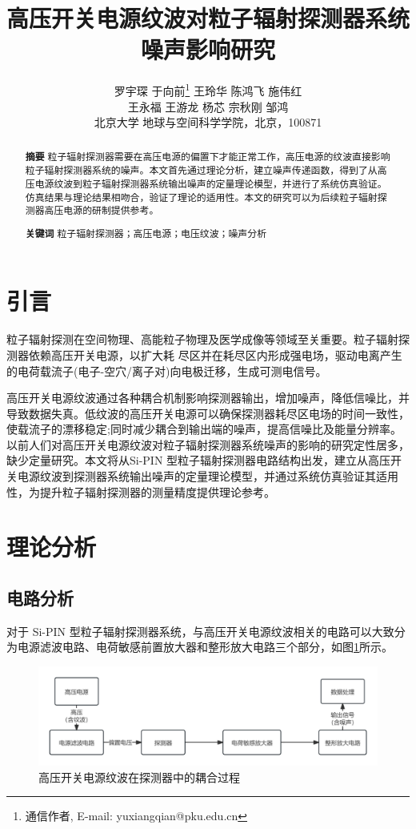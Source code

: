 \documentclass[twocolumn]{ctexart}
\title{高压开关电源纹波对粒子辐射探测器系统噪声影响研究}
\author{
    罗宇琛 \quad 于向前\thanks{通信作者, E-mail: yuxiangqian@pku.edu.cn} \quad 王玲华 \quad 陈鸿飞 \quad 施伟红 \\ 王永福 \quad 王游龙 \quad 杨芯 \quad 宗秋刚 \quad 邹鸿 \\[1ex]
    \small{北京大学 地球与空间科学学院，北京，100871}
}
\date{}
\begin{document}
\begin{abstract}
\noindent\textbf{摘要} \quad 粒子辐射探测器需要在高压电源的偏置下才能正常工作，高压电源的纹波直接影响粒子辐射探测器系统的噪声。本文首先通过理论分析，建立噪声传递函数，得到了从高压电源纹波到粒子辐射探测器系统输出噪声的定量理论模型，并进行了系统仿真验证。仿真结果与理论结果相吻合，验证了理论的适用性。本文的研究可以为后续粒子辐射探测器高压电源的研制提供参考。
\vspace{1em}

\noindent\textbf{关键词} \quad 粒子辐射探测器；高压电源；电压纹波；噪声分析
\end{abstract}

\maketitle
\thispagestyle{empty}

\section{引言}

粒子辐射探测在空间物理、高能粒子物理及医学成像等领域至关重要\cite{1, 2, 3}。粒子辐射探测器依赖高压开关电源，以扩大耗
尽区并在耗尽区内形成强电场，驱动电离产生的电荷载流子(电子-空穴/离子对)向电极迁移，生成可测电信号。

高压开关电源纹波通过各种耦合机制影响探测器输出，增加噪声，降低信噪比，并导致数据失真\cite{4}。低纹波的高压开关电源可以确保探测器耗尽区电场的时间一致性，使载流子的漂移稳定;同时减少耦合到输出端的噪声，提高信噪比及能量分辨率\cite{5}。以前人们对高压开关电源纹波对粒子辐射探测器系统噪声的影响的研究定性居多，缺少定量研究\cite{6, 7}。本文将从Si-PIN 型粒子辐射探测器电路结构出发，建立从高压开关电源纹波到探测器系统输出噪声的定量理论模型，并通过系统仿真验证其适用性，为提升粒子辐射探测器的测量精度提供理论参考。


\section{理论分析}

\subsection{电路分析}

对于 Si-PIN 型粒子辐射探测器系统，与高压开关电源纹波相关的电路可以大致分为电源滤波电路、电荷敏感前置放大器和整形放大电路三个部分，如图\ref{fig:overall_system}所示。

\begin{figure}[htbp]
    \centering
    \includegraphics[width=\linewidth]{./overall_system.png}
    \caption{高压开关电源纹波在探测器中的耦合过程}
    \label{fig:overall_system}
\end{figure}
\end{document}
